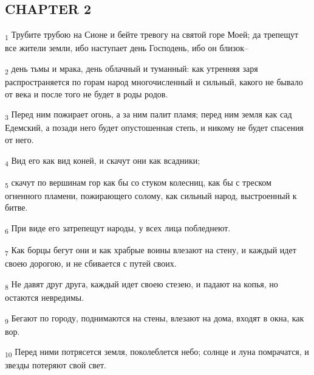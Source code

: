 \subsection{CHAPTER 2}
\begin{tcolorbox}
\textsubscript{1} Трубите трубою на Сионе и бейте тревогу на святой горе Моей; да трепещут все жители земли, ибо наступает день Господень, ибо он близок--
\end{tcolorbox}
\begin{tcolorbox}
\textsubscript{2} день тьмы и мрака, день облачный и туманный: как утренняя заря распространяется по горам народ многочисленный и сильный, какого не бывало от века и после того не будет в роды родов.
\end{tcolorbox}
\begin{tcolorbox}
\textsubscript{3} Перед ним пожирает огонь, а за ним палит пламя; перед ним земля как сад Едемский, а позади него будет опустошенная степь, и никому не будет спасения от него.
\end{tcolorbox}
\begin{tcolorbox}
\textsubscript{4} Вид его как вид коней, и скачут они как всадники;
\end{tcolorbox}
\begin{tcolorbox}
\textsubscript{5} скачут по вершинам гор как бы со стуком колесниц, как бы с треском огненного пламени, пожирающего солому, как сильный народ, выстроенный к битве.
\end{tcolorbox}
\begin{tcolorbox}
\textsubscript{6} При виде его затрепещут народы, у всех лица побледнеют.
\end{tcolorbox}
\begin{tcolorbox}
\textsubscript{7} Как борцы бегут они и как храбрые воины влезают на стену, и каждый идет своею дорогою, и не сбивается с путей своих.
\end{tcolorbox}
\begin{tcolorbox}
\textsubscript{8} Не давят друг друга, каждый идет своею стезею, и падают на копья, но остаются невредимы.
\end{tcolorbox}
\begin{tcolorbox}
\textsubscript{9} Бегают по городу, поднимаются на стены, влезают на дома, входят в окна, как вор.
\end{tcolorbox}
\begin{tcolorbox}
\textsubscript{10} Перед ними потрясется земля, поколеблется небо; солнце и луна помрачатся, и звезды потеряют свой свет.
\end{tcolorbox}
